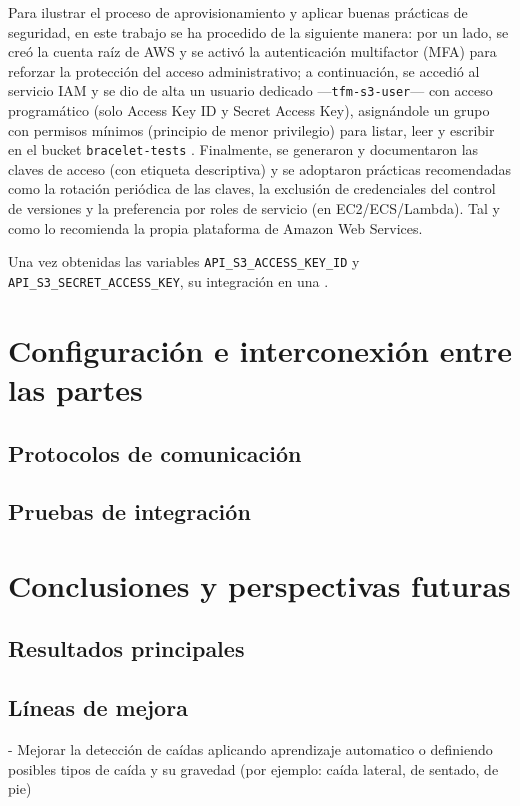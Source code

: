 \documentclass[12pt, a4paper]{article}
\begin{document}
	Para ilustrar el proceso de aprovisionamiento y aplicar buenas prácticas de seguridad, en este trabajo se ha procedido de la siguiente manera: por un lado, se creó la cuenta raíz de AWS y se activó la autenticación multifactor (MFA) para reforzar la protección del acceso administrativo; a continuación, se accedió al servicio IAM y se dio de alta un usuario dedicado —\texttt{tfm-s3-user}— con acceso programático (solo Access Key ID y Secret Access Key), asignándole un grupo con permisos mínimos (principio de menor privilegio) para listar, leer y escribir en el bucket \texttt{bracelet-tests} \cite{awsiam}. Finalmente, se generaron y documentaron las claves de acceso (con etiqueta descriptiva) y se adoptaron prácticas recomendadas como la rotación periódica de las claves, la exclusión de credenciales del control de versiones y la preferencia por roles de servicio (en EC2/ECS/Lambda). Tal y como lo recomienda la propia plataforma de Amazon Web Services.
	
	Una vez obtenidas las variables  
	\texttt{API\_S3\_ACCESS\_KEY\_ID} y  
	\texttt{API\_S3\_SECRET\_ACCESS\_KEY}, su integración en una  \cite{mhealth}.
	
\section{Configuración e interconexión entre las partes}
	\subsection{Protocolos de comunicación}
	\subsection{Pruebas de integración}

\section{Conclusiones y perspectivas futuras}
	\subsection{Resultados principales}
	\subsection{Líneas de mejora}
	
	- Mejorar la detección de caídas aplicando aprendizaje automatico o definiendo posibles tipos de caída y su gravedad (por ejemplo: caída lateral, de sentado, de pie)  
\end{document}
